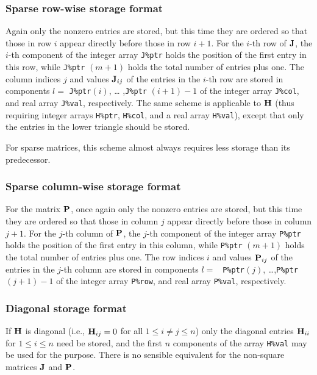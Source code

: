\documentclass{galahad}
\begin{document}

\subsubsection{Sparse row-wise storage format}\label{rowwise}
Again only the nonzero entries are stored, but this time they are
ordered so that those in row $i$ appear directly before those in row
$i+1$. For the $i$-th row of ${\mathbf{J}}$, the $i$-th component of the integer
array {\tt J\%ptr} holds the position of the first entry in this row,
while {\tt J\%ptr} $(m+1)$ holds the total number of entries plus one.
The column indices $j$ and values ${\mathbf{J}}_{ij}$ of the entries in the
$i$-th row are stored in components $l =$ {\tt J\%ptr}$(i)$, \ldots
,{\tt J\%ptr} $(i+1)-1$ of the integer array {\tt J\%col}, and real
array {\tt J\%val}, respectively.
The same scheme is applicable to
${\mathbf{H}}$ (thus requiring integer arrays {\tt H\%ptr}, {\tt H\%col}, and
a real array {\tt H\%val}),
except that only the entries in the lower triangle should be stored.

For sparse matrices, this scheme almost always requires less storage than
its predecessor.

\subsubsection{Sparse column-wise storage format}\label{columnwise}
For the matrix ${\mathbf{P}}$, once again only the nonzero entries are
stored, but this time they are ordered so that those in column $j$ appear
directly before those in column $j+1$. For the $j$-th column of ${\mathbf{P}}$, the
$j$-th component of the integer array {\tt P\%ptr} holds the position of the
first entry in this column, while {\tt P\%ptr} $(m+1)$ holds the total number
of entries plus one.  The row indices $i$ and values ${\mathbf{P}}_{ij}$ of the
entries in the $j$-th column are stored in components $l =$ {\tt
  P\%ptr}$(j)$, \ldots ,{\tt P\%ptr} $(j+1)-1$ of the integer array
{\tt P\%row}, and real array {\tt P\%val}, respectively.

\subsubsection{Diagonal storage format}\label{diagonal}
If ${\mathbf{H}}$ is diagonal (i.e., ${\mathbf{H}}_{ij} = 0$ for all $1 \leq i \neq j \leq n$)
only the diagonal entries ${\mathbf{H}}_{ii}$ for $1 \leq i \leq n$ need be stored,
and the first $n$ components of the array {\tt H\%val} may be used for
the purpose. There is no sensible equivalent for the non-square
matrices ${\mathbf{J}}$ and ${\mathbf{P}}$.
\end{document}
